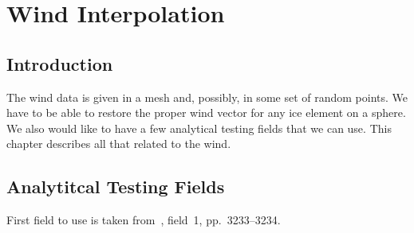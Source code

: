 
\chapter{Wind Interpolation}


\section{Introduction}

The wind data is given in a mesh and, possibly, in some set of random
points. We have to be able to restore the proper wind vector for any
ice element on a sphere. We also would like to have a few analytical
testing fields that we can use. This chapter describes all that
related to the wind.


\section{Analytitcal Testing Fields}

First field to use is taken from~\cite{bib:fuselier2009stability},
field~1, pp.~3233--3234.
